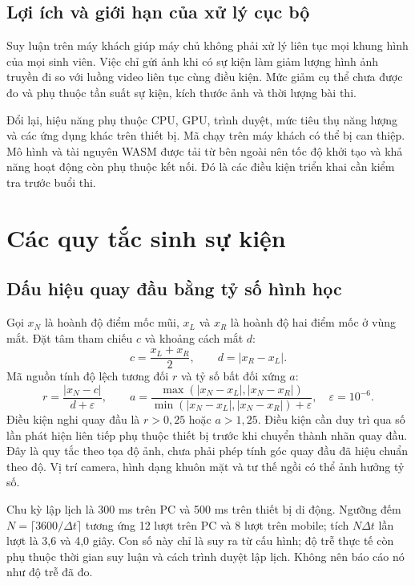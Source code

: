 \subsection{Lợi ích và giới hạn của xử lý cục bộ}
Suy luận trên máy khách giúp máy chủ không phải xử lý liên tục mọi khung hình của mọi sinh viên. Việc chỉ gửi ảnh khi có sự kiện làm giảm lượng hình ảnh truyền đi so với luồng video liên tục cùng điều kiện. Mức giảm cụ thể chưa được đo và phụ thuộc tần suất sự kiện, kích thước ảnh và thời lượng bài thi.

Đổi lại, hiệu năng phụ thuộc CPU, GPU, trình duyệt, mức tiêu thụ năng lượng và các ứng dụng khác trên thiết bị. Mã chạy trên máy khách có thể bị can thiệp. Mô hình và tài nguyên WASM được tải từ bên ngoài nên tốc độ khởi tạo và khả năng hoạt động còn phụ thuộc kết nối. Đó là các điều kiện triển khai cần kiểm tra trước buổi thi.

\section{Các quy tắc sinh sự kiện}
\subsection{Dấu hiệu quay đầu bằng tỷ số hình học}
Gọi $x_N$ là hoành độ điểm mốc mũi, $x_L$ và $x_R$ là hoành độ hai điểm mốc ở vùng mắt. Đặt tâm tham chiếu $c$ và khoảng cách mắt $d$:
\begin{equation}
 c=\frac{x_L+x_R}{2},\qquad d=|x_R-x_L|.
\end{equation}
Mã nguồn tính độ lệch tương đối $r$ và tỷ số bất đối xứng $a$:
\begin{equation}
 r=\frac{|x_N-c|}{d+\varepsilon},\qquad
 a=\frac{\max(|x_N-x_L|,|x_N-x_R|)}{\min(|x_N-x_L|,|x_N-x_R|)+\varepsilon},
 \quad\varepsilon=10^{-6}.
\end{equation}
Điều kiện nghi quay đầu là $r>0{,}25$ hoặc $a>1{,}25$. Điều kiện cần duy trì qua số lần phát hiện liên tiếp phụ thuộc thiết bị trước khi chuyển thành nhãn quay đầu. Đây là quy tắc theo tọa độ ảnh, chưa phải phép tính góc quay đầu đã hiệu chuẩn theo độ. Vị trí camera, hình dạng khuôn mặt và tư thế ngồi có thể ảnh hưởng tỷ số.

Chu kỳ lập lịch là 300 ms trên PC và 500 ms trên thiết bị di động. Ngưỡng đếm $N=\lceil3600/\Delta t\rceil$ tương ứng 12 lượt trên PC và 8 lượt trên mobile; tích $N\Delta t$ lần lượt là 3,6 và 4,0 giây. Con số này chỉ là suy ra từ cấu hình; độ trễ thực tế còn phụ thuộc thời gian suy luận và cách trình duyệt lập lịch. Không nên báo cáo nó như độ trễ đã đo.

